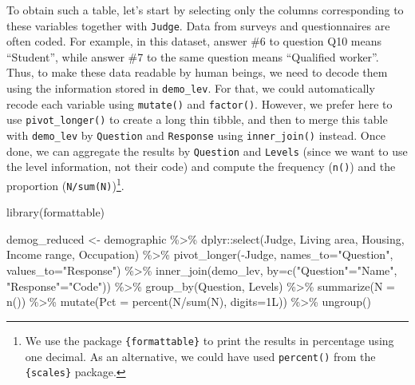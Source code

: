 \documentclass[
]{book}
\newenvironment{Shaded}{\begin{snugshade}}{\end{snugshade}}
\newcommand{\AttributeTok}[1]{\textcolor[rgb]{0.77,0.63,0.00}{#1}}
\newcommand{\FunctionTok}[1]{\textcolor[rgb]{0.00,0.00,0.00}{#1}}
\newcommand{\NormalTok}[1]{#1}
\newcommand{\OtherTok}[1]{\textcolor[rgb]{0.56,0.35,0.01}{#1}}
\newcommand{\SpecialCharTok}[1]{\textcolor[rgb]{0.00,0.00,0.00}{#1}}
\newcommand{\StringTok}[1]{\textcolor[rgb]{0.31,0.60,0.02}{#1}}
\begin{document}
To obtain such a table, let's start by selecting only the columns corresponding to these variables together with \texttt{Judge}.
Data from surveys and questionnaires are often coded. For example, in this dataset, answer \#6 to question Q10 means ``Student'', while answer \#7 to the same question means ``Qualified worker''. Thus, to make these data readable by human beings, we need to decode them using the information stored in \texttt{demo\_lev}. For that, we could automatically recode each variable using \texttt{mutate()} and \texttt{factor()}. However, we prefer here to use \texttt{pivot\_longer()} to create a long thin tibble, and then to merge this table with \texttt{demo\_lev} by \texttt{Question} and \texttt{Response} using \texttt{inner\_join()} instead. Once done, we can aggregate the results by \texttt{Question} and \texttt{Levels} (since we want to use the level information, not their code) and compute the frequency (\texttt{n()}) and the proportion (\texttt{N/sum(N)})\footnote{We use the package \texttt{\{formattable\}} to print the results in percentage using one decimal. As an alternative, we could have used \texttt{percent()} from the \texttt{\{scales\}} package.}.

\begin{Shaded}
\begin{Highlighting}[]
\FunctionTok{library}\NormalTok{(formattable)}

\NormalTok{demog\_reduced }\OtherTok{\textless{}{-}}\NormalTok{ demographic }\SpecialCharTok{\%\textgreater{}\%} 
\NormalTok{  dplyr}\SpecialCharTok{::}\FunctionTok{select}\NormalTok{(Judge, }\StringTok{\textasciigrave{}}\AttributeTok{Living area}\StringTok{\textasciigrave{}}\NormalTok{, Housing, }\StringTok{\textasciigrave{}}\AttributeTok{Income range}\StringTok{\textasciigrave{}}\NormalTok{, }\StringTok{\textasciigrave{}}\AttributeTok{Occupation}\StringTok{\textasciigrave{}}\NormalTok{) }\SpecialCharTok{\%\textgreater{}\%} 
  \FunctionTok{pivot\_longer}\NormalTok{(}\SpecialCharTok{{-}}\NormalTok{Judge, }\AttributeTok{names\_to=}\StringTok{"Question"}\NormalTok{, }\AttributeTok{values\_to=}\StringTok{"Response"}\NormalTok{) }\SpecialCharTok{\%\textgreater{}\%} 
  \FunctionTok{inner\_join}\NormalTok{(demo\_lev, }\AttributeTok{by=}\FunctionTok{c}\NormalTok{(}\StringTok{"Question"}\OtherTok{=}\StringTok{"Name"}\NormalTok{, }\StringTok{"Response"}\OtherTok{=}\StringTok{"Code"}\NormalTok{)) }\SpecialCharTok{\%\textgreater{}\%} 
  \FunctionTok{group\_by}\NormalTok{(Question, Levels) }\SpecialCharTok{\%\textgreater{}\%} 
  \FunctionTok{summarize}\NormalTok{(}\AttributeTok{N =} \FunctionTok{n}\NormalTok{()) }\SpecialCharTok{\%\textgreater{}\%} 
  \FunctionTok{mutate}\NormalTok{(}\AttributeTok{Pct =} \FunctionTok{percent}\NormalTok{(N}\SpecialCharTok{/}\FunctionTok{sum}\NormalTok{(N), }\AttributeTok{digits=}\NormalTok{1L)) }\SpecialCharTok{\%\textgreater{}\%} 
  \FunctionTok{ungroup}\NormalTok{()}
\end{Highlighting}
\end{Shaded}
\end{document}
